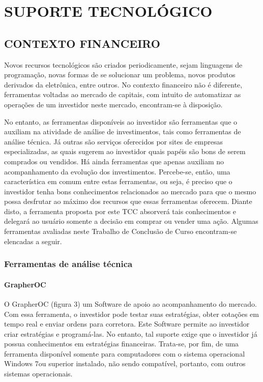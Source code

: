\chapter[SUPORTE TECNOLOGICO]{SUPORTE TECNOLÓGICO}
\section{CONTEXTO FINANCEIRO}

Novos recursos tecnológicos são criados periodicamente, sejam linguagens de programação, novas formas de se solucionar um problema, novos produtos derivados da eletrônica, entre outros. No contexto financeiro não é diferente, ferramentas voltadas ao mercado de capitais, com intuito de automatizar as operações de um investidor neste mercado, encontram-se à disposição.

No entanto, as ferramentas disponíveis ao investidor são ferramentas que o auxiliam na atividade de análise de investimentos, tais como ferramentas de análise técnica. Já outras são serviços oferecidos por sites de empresas especializadas, as quais sugerem ao investidor quais papéis são bons de serem comprados ou vendidos. Há ainda ferramentas que apenas auxiliam no acompanhamento da evolução dos investimentos. Percebe-se, então, uma característica em comum entre estas ferramentas, ou seja, é preciso que o investidor tenha bons conhecimentos relacionados ao mercado para que o mesmo possa desfrutar ao máximo dos recursos que essas ferramentas oferecem. Diante disto, a ferramenta proposta por este TCC absorverá tais conhecimentos e delegará ao usuário somente a decisão em comprar ou vender uma ação. Algumas ferramentas avaliadas neste Trabalho de Conclusão de Curso encontram-se elencadas a seguir.

\subsection{Ferramentas de análise técnica}

\subsubsection{GrapherOC}

O GrapherOC (figura 3) um Software de apoio ao acompanhamento do mercado. Com essa ferramenta, o investidor pode testar suas estratégias, obter cotações em tempo real e enviar ordens para corretora. Este Software permite ao investidor criar estratégias e programá-las. No entanto, tal suporte exige que o investidor já possua conhecimentos em estratégias financeiras. Trata-se, por fim, de uma ferramenta disponível somente para computadores com o sistema operacional Windows 7\textregistered ou superior instalado, não sendo compatível, portanto, com outros sistemas operacionais.



